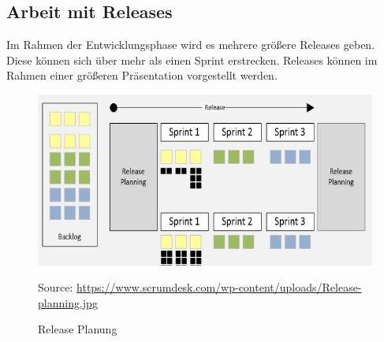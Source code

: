\subsection{Arbeit mit Releases}
Im Rahmen der Entwicklungsphase wird es mehrere größere Releases geben. Diese können sich über mehr als einen Sprint erstrecken. Releases können im Rahmen einer größeren Präsentation vorgestellt werden.
\begin{figure}[!ht]
	\centering
	\includegraphics[width=\textwidth]{./ressourcen/release-planning.jpg}
	\caption{Release Planung}
	Source: \url{https://www.scrumdesk.com/wp-content/uploads/Release-planning.jpg}
\end{figure}

